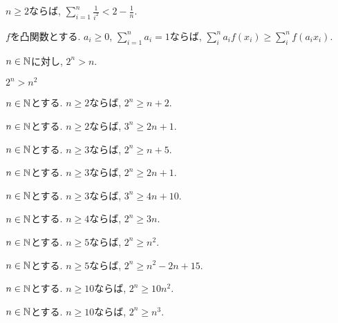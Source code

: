\begin{prop}
  $n\geq 2$ならば,
  $\sum_{i=1}^{n}\frac{1}{i^2}<2-\frac{1}{n}$.
\end{prop}

\begin{prop}
  $f$を凸関数とする.
  $a_i\geq 0$, $\sum_{i=1}^n a_i=1$ならば,
  $\sum_{i}^{n} a_i f(x_i)\geq \sum_{i}^{n}  f(a_i x_i)$.
\end{prop}


\begin{prop}
$n\in\mathbb{N}$に対し, $2^n> n$.
\end{prop}

\begin{prop}
  $2^n>n^2$
\end{prop}

\begin{prop}
$n\in\mathbb{N}$とする.
  $n\geq 2$ならば, $2^n \geq n+2$.
\end{prop}

\begin{prop}
$n\in\mathbb{N}$とする.
  $n\geq 2$ならば, $3^n \geq 2n+1$.
\end{prop}


\begin{prop}
$n\in\mathbb{N}$とする.
  $n\geq 3$ならば, $2^n\geq n+5$.
\end{prop}

\begin{prop}
$n\in\mathbb{N}$とする.
  $n\geq 3$ならば, $2^n\geq 2n+1$.
\end{prop}

\begin{prop}
$n\in\mathbb{N}$とする.
  $n\geq 3$ならば, $3^n\geq 4n+10$.
\end{prop}

\begin{prop}
$n\in\mathbb{N}$とする.
  $n\geq 4$ならば, $2^n\geq 3n$.
\end{prop}


\begin{prop}
$n\in\mathbb{N}$とする.
  $n\geq 5$ならば, $2^n\geq n^2$.
\end{prop}

\begin{prop}
$n\in\mathbb{N}$とする.
  $n\geq 5$ならば, $2^n\geq n^2-2n+15$.
\end{prop}


\begin{prop}
$n\in\mathbb{N}$とする.
  $n\geq 10$ならば, $2^n\geq 10n^2$.
\end{prop}

\begin{prop}
$n\in\mathbb{N}$とする.
  $n\geq 10$ならば, $2^n\geq n^3$.
\end{prop}

